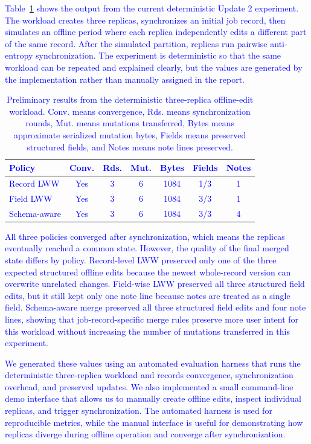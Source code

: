 \documentclass[10pt,twocolumn]{article}
\newcommand{\update}[1]{\textcolor{blue}{#1}}
\begin{document}
\update{Table~\ref{tab:results} shows the output from the current deterministic Update 2 experiment. The workload creates three replicas, synchronizes an initial job record, then simulates an offline period where each replica independently edits a different part of the same record. After the simulated partition, replicas run pairwise anti-entropy synchronization. The experiment is deterministic so that the same workload can be repeated and explained clearly, but the values are generated by the implementation rather than manually assigned in the report.}

\begin{table}[t]
\centering
\small
\update{
\begin{tabular}{@{}p{}cccccc@{}}
\toprule
Policy & Conv. & Rds. & Mut. & Bytes & Fields & Notes \\
\midrule
Record LWW & Yes & 3 & 6 & 1084 & 1/3 & 1 \\
Field LWW & Yes & 3 & 6 & 1084 & 3/3 & 1 \\
Schema-aware & Yes & 3 & 6 & 1084 & 3/3 & 4 \\
\bottomrule
\end{tabular}
}
\caption{\update{Preliminary results from the deterministic three-replica offline-edit workload. Conv. means convergence, Rds. means synchronization rounds, Mut. means mutations transferred, Bytes means approximate serialized mutation bytes, Fields means preserved structured fields, and Notes means note lines preserved.}}
\label{tab:results}
\end{table}

\update{All three policies converged after synchronization, which means the replicas eventually reached a common state. However, the quality of the final merged state differs by policy. Record-level LWW preserved only one of the three expected structured offline edits because the newest whole-record version can overwrite unrelated changes. Field-wise LWW preserved all three structured field edits, but it still kept only one note line because notes are treated as a single field. Schema-aware merge preserved all three structured field edits and four note lines, showing that job-record-specific merge rules preserve more user intent for this workload without increasing the number of mutations transferred in this experiment.}

\update{We generated these values using an automated evaluation harness that runs the deterministic three-replica workload and records convergence, synchronization overhead, and preserved updates. We also implemented a small command-line demo interface that allows us to manually create offline edits, inspect individual replicas, and trigger synchronization. The automated harness is used for reproducible metrics, while the manual interface is useful for demonstrating how replicas diverge during offline operation and converge after synchronization.}
\end{document}
